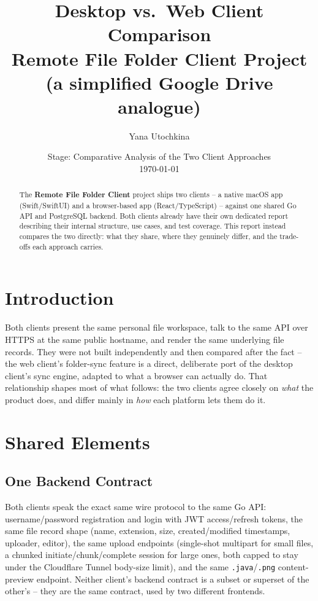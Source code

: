 \documentclass[12pt,a4paper]{article}
\title{\textbf{Desktop vs.\ Web Client Comparison\\[2pt] \large Remote File Folder Client Project\\(a simplified Google Drive analogue)}}
\author{Yana Utochkina}
\date{Stage: Comparative Analysis of the Two Client Approaches \\ \today}
\begin{document}
\maketitle

\begin{abstract}
\noindent
The \textbf{Remote File Folder Client} project ships two clients -- a native macOS app (Swift/SwiftUI) and a browser-based app (React/TypeScript) -- against one shared Go API and PostgreSQL backend. Both clients already have their own dedicated report describing their internal structure, use cases, and test coverage. This report instead compares the two directly: what they share, where they genuinely differ, and the trade-offs each approach carries.
\end{abstract}

\tableofcontents
\newpage

\section{Introduction}

Both clients present the same personal file workspace, talk to the same API over HTTPS at the same public hostname, and render the same underlying file records. They were not built independently and then compared after the fact -- the web client's folder-sync feature is a direct, deliberate port of the desktop client's sync engine, adapted to what a browser can actually do. That relationship shapes most of what follows: the two clients agree closely on \emph{what} the product does, and differ mainly in \emph{how} each platform lets them do it.

\section{Shared Elements}

\subsection{One Backend Contract}

Both clients speak the exact same wire protocol to the same Go API: username/password registration and login with JWT access/refresh tokens, the same file record shape (name, extension, size, created/modified timestamps, uploader, editor), the same upload endpoints (single-shot multipart for small files, a chunked initiate/chunk/complete session for large ones, both capped to stay under the Cloudflare Tunnel body-size limit), and the same \texttt{.java}/\texttt{.png} content-preview endpoint. Neither client's backend contract is a subset or superset of the other's -- they are the same contract, used by two different frontends.
\end{document}
